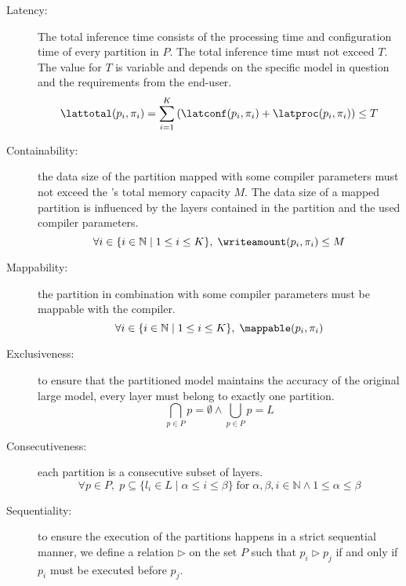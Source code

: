 \begin{description}
    \item[Latency:] 
    The total inference time consists of the processing time and configuration time of every partition in $P$.
    The total inference time must not exceed $T$.
    The value for $T$ is variable and depends on the specific model in question and the requirements from the end-user.
    \begin{equation}
        \lattotal(p_i, \pi_i) = \sum_{i=1}^{K} \left( \latconf(p_i, \pi_i) + \latproc(p_i, \pi_i) \right) \leq T
    \end{equation}
    \item[Containability:]
    the data size of the partition mapped with some compiler parameters must not exceed the \graicore{}'s total memory capacity $M$.
    The data size of a mapped partition is influenced by the layers contained in the partition and the used compiler parameters.
    \begin{equation}
        \forall i \in \{i \in \mathbb{N} \mid 1 \leq i \leq K\}, \; \writeamount(p_i, \pi_i) \leq M
    \end{equation}
    \item[Mappability:]
    the partition in combination with some compiler parameters must be mappable with the compiler.
    \begin{equation}
        \forall i \in \{i \in \mathbb{N} \mid 1 \leq i \leq K\}, \; \mappable(p_i, \pi_i)
    \end{equation}
    \item[Exclusiveness:]
    to ensure that the partitioned model maintains the accuracy of the original large model, every layer must belong to exactly one partition.
    \begin{equation}
        \bigcap_{p \in P} p = \emptyset \wedge \bigcup_{p \in P}p = L
    \end{equation}
    \item[Consecutiveness:]
    each partition is a consecutive subset of layers.
    \begin{equation}
        \forall p \in P, \; p \subseteq \{l_i \in L \mid \alpha \leq i \leq \beta\} \; \text{for} \;  \alpha, \beta, i \in \mathbb{N} \wedge 1 \leq \alpha \leq \beta
    \end{equation}
    \item[Sequentiality:]
    to ensure the execution of the partitions happens in a strict sequential manner, we define a relation $\triangleright$ on the set $P$ such that $p_i \triangleright p_j$ if and only if $p_i$ must be executed before $p_j$.

\end{description}
